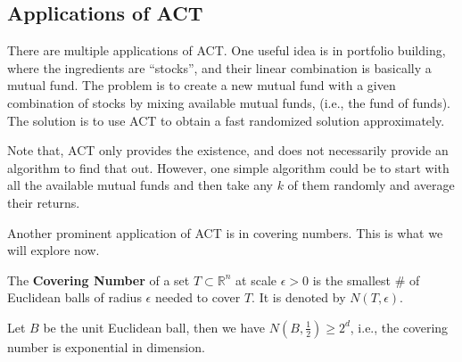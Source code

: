 \documentclass[12pt]{article}
\begin{document}
\subsection{Applications of ACT}

There are multiple applications of ACT. One useful idea is in portfolio building, where the ingredients are ``stocks'', and their linear combination is basically a mutual fund. The problem is to create a new mutual fund with a given combination of stocks by mixing available mutual funds, (i.e., the fund of funds). The solution is to use ACT to obtain a fast randomized solution approximately.

\begin{note}
    Note that, ACT only provides the existence, and does not necessarily provide an algorithm to find that out. However, one simple algorithm could be to start with all the available mutual funds and then take any $k$ of them randomly and average their returns.
\end{note}

Another prominent application of ACT is in covering numbers. This is what we will explore now.

\begin{definitionbox}
    The \textbf{Covering Number} of a set $T \subset \mathbb{R}^n$ at scale $\epsilon > 0$ is the smallest \# of Euclidean balls of radius $\epsilon$ needed to cover $T$. It is denoted by $N(T,\epsilon)$.
\end{definitionbox}


\begin{lemmabox}
    Let $B$ be the unit Euclidean ball, then we have $N(B, \frac{1}{2}) \geq 2^d$, i.e., the covering number is exponential in dimension.
\end{lemmabox}
\end{document}
